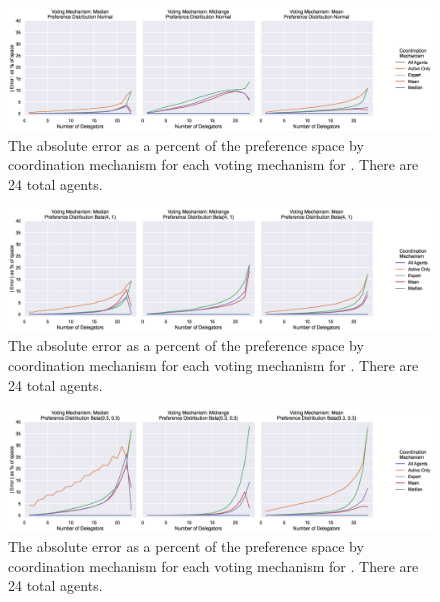 \begin{landscape}
    \begin{figure}[p]
        \centering
        \includegraphics[scale=0.55]
        {content/chapter2/figures/distributions/Normal_error_as_percent_of_space_abs_mean}
        \caption{
            The absolute error as a percent of the preference space by coordination
            mechanism for each voting mechanism for \gaussiandist.
            There are 24 total agents.
        }
        \label{fig:normal-error-as-percent-of-space-abs-mean}
    \end{figure}
\end{landscape}

\begin{landscape}
    \begin{figure}[p]
        \centering
        \includegraphics[scale=0.55]
        {content/chapter2/figures/distributions/Beta_4_1_error_as_percent_of_space_abs_mean}
        \caption{
            The absolute error as a percent of the preference space by coordination
            mechanism for each voting mechanism for .
            There are 24 total agents.
        }
        \label{fig:beta-4-1-error-as-percent-of-space-abs-mean}
    \end{figure}
\end{landscape}

\begin{landscape}
    \begin{figure}[p]
        \centering
        \includegraphics[scale=0.55]
        {content/chapter2/figures/distributions/Beta_0.3_0.3_error_as_percent_of_space_abs_mean}
        \caption{
            The absolute error as a percent of the preference space by coordination
            mechanism for each voting mechanism for .
            There are 24 total agents.
        }
        \label{fig:beta-.3-.3-error-as-percent-of-space-abs-mean}
    \end{figure}
\end{landscape}